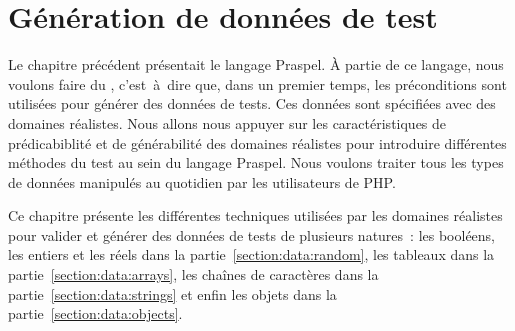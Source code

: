 \chapter{Génération de données de test}
\label{chapter:data}

\mminitoc

Le chapitre précédent présentait le langage Praspel. À partie de ce langage,
nous voulons faire du , c'est~à~dire que, dans
un premier temps, les préconditions sont utilisées pour générer des données de
tests. Ces données sont spécifiées avec des domaines réalistes. Nous allons nous
appuyer sur les caractéristiques de prédicabiblité et de générabilité des
domaines réalistes pour introduire différentes méthodes du test au sein du
langage Praspel. Nous voulons traiter tous les types de données manipulés au
quotidien par les utilisateurs de PHP.

Ce chapitre présente les différentes techniques utilisées par les domaines
réalistes pour valider et générer des données de tests de plusieurs natures~:
les booléens, les entiers et les réels dans la partie~\ref{section:data:random},
les tableaux dans la partie~\ref{section:data:arrays}, les chaînes de caractères
dans la partie~\ref{section:data:strings} et enfin les objets dans la
partie~\ref{section:data:objects}.

